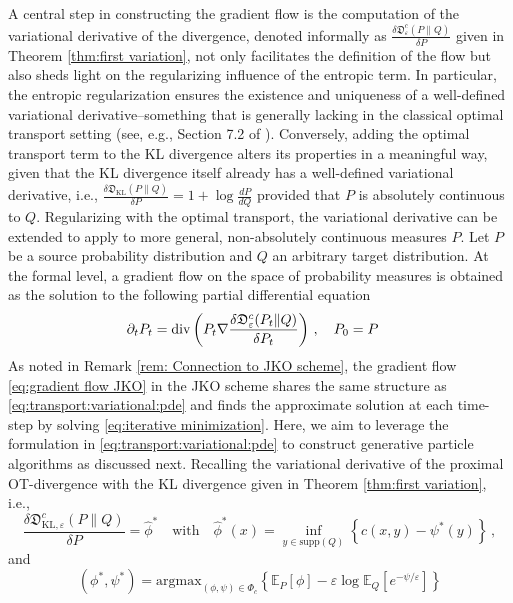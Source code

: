 \documentclass{amsart}
\theoremstyle{definition}
\theoremstyle{remark}
\numberwithin{equation}{section}
\begin{document}
A central step in constructing the gradient flow is the computation of the variational derivative of the divergence, denoted informally as $\frac{\delta  \mathfrak{D}^{c}_{\varepsilon}(P\|Q)}{\delta P}$ given in Theorem \ref{thm:first variation}, not only facilitates the definition of the flow but also sheds light on the regularizing influence of the entropic term. In particular, the entropic regularization ensures the existence and uniqueness of a well-defined variational derivative--something that is generally lacking in the classical optimal transport setting (see, e.g., Section 7.2 of \cite{Santambrogio}).  Conversely, adding the optimal transport term to the KL divergence alters its properties in a meaningful way, given that the KL divergence itself already has a well-defined variational derivative, i.e., 
$\frac{\delta  \mathfrak{D}_{\mathrm{KL}}(P\|Q)}{\delta P} = 1+\log\frac{dP}{dQ}$
provided that $P$ is absolutely continuous to $Q$. Regularizing with the optimal transport,  the variational derivative can be extended to apply to more general, non-absolutely continuous measures $P$.  Let $P$ be a source probability distribution and $Q$ an arbitrary target distribution. At the formal level, a gradient flow on the space of probability measures is obtained as the solution to the following partial differential equation
\begin{equation}
\begin{aligned}
     & \partial_{t}P_t ={\rm div}\left(P_t\nabla\frac{\delta  \mathfrak{D}^{c}_{\varepsilon}(P_t\|Q)}{\delta P_t}\right)  \,, \quad P_0=P\label{eq:transport:variational:pde}
     \end{aligned}
\end{equation} 
As noted in Remark \ref{rem: Connection to JKO scheme}, the gradient flow \eqref{eq:gradient flow JKO} in the JKO scheme shares the same structure as \eqref{eq:transport:variational:pde} and finds  the approximate solution at each time-step by solving \eqref{eq:iterative minimization}. Here, we aim to leverage the formulation in \eqref{eq:transport:variational:pde} to construct generative particle algorithms as discussed next. Recalling the variational derivative of the proximal OT-divergence with the KL divergence given in Theorem \ref{thm:first variation}, i.e.,
\[
\frac{\delta  \mathfrak{D}_{\mathrm{KL},\varepsilon}^{c}(P\|Q)}{\delta P}= \widehat{\phi}^{*} \quad\mathrm{with}\quad\widehat{\phi}^{*}(x)=\inf_{y \in \textrm{supp}(Q)} \left\{ c(x,y)- \psi^*(y) \right\}\,,
\]
and 
\[
(\phi^*,\psi^*)=\textrm{argmax}_{(\phi,\psi)\in\Phi_c}\left\{\mathbb{E}_{P}[\phi] - \varepsilon \log \mathbb{E}_Q[ e^{-\psi/\varepsilon}]\right\}
\]
\end{document}
